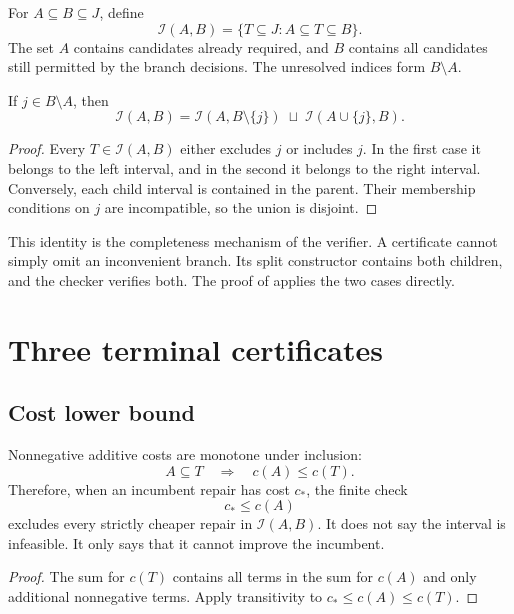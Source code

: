 \begin{definition}
For $A\subseteq B\subseteq J$, define
\[
 \mathcal I(A,B)=\{T\subseteq J:A\subseteq T\subseteq B\}.
\]
The set $A$ contains candidates already required, and $B$ contains all candidates still permitted by the branch decisions. The unresolved indices form $B\setminus A$.
\end{definition}

\begin{lemma}
If $j\in B\setminus A$, then
\[
 \mathcal I(A,B)=
 \mathcal I(A,B\setminus\{j\})\;\sqcup\;
 \mathcal I(A\cup\{j\},B).
\]
\end{lemma}
\begin{proof}
Every $T\in\mathcal I(A,B)$ either excludes $j$ or includes $j$. In the first case it belongs to the left interval, and in the second it belongs to the right interval. Conversely, each child interval is contained in the parent. Their membership conditions on $j$ are incompatible, so the union is disjoint.
\end{proof}

This identity is the completeness mechanism of the verifier. A certificate cannot simply omit an inconvenient branch. Its split constructor contains both children, and the checker verifies both. The proof of  applies the two cases directly.

\section{Three terminal certificates}

\subsection{Cost lower bound}

Nonnegative additive costs are monotone under inclusion:
\[
 A\subseteq T\quad\Longrightarrow\quad c(A)\leq c(T).
\]
Therefore, when an incumbent repair has cost $c_\ast$, the finite check
\[
 c_\ast\leq c(A)
\]
excludes every strictly cheaper repair in $\mathcal I(A,B)$. It does not say the interval is infeasible. It only says that it cannot improve the incumbent.

\begin{proof}
The sum for $c(T)$ contains all terms in the sum for $c(A)$ and only additional nonnegative terms. Apply transitivity to $c_\ast\leq c(A)\leq c(T)$.
\end{proof}

